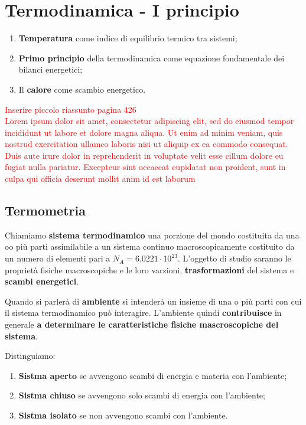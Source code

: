 \documentclass[x11names]{report}
\begin{document}
	
	
	
	\newpage
	
	\chapter{Termodinamica - I principio}
	\begin{es}{}
		\begin{enumerate}
			\item \textbf{Temperatura} come indice di equilibrio termico tra sistemi;
			\item \textbf{Primo principio} della termodinamica come equazione fondamentale dei bilanci energetici;
			\item Il \textbf{calore} come scambio energetico.
		\end{enumerate}
	\end{es}
	
	
	\textcolor{red}{Inserire piccolo riassunto pagina 426}\\
	
	\textcolor{red}{Lorem ipsum dolor sit amet, consectetur adipiscing elit, sed do eiusmod tempor incididunt ut labore et dolore magna aliqua. Ut enim ad minim veniam, quis nostrud exercitation ullamco laboris nisi ut aliquip ex ea commodo consequat. Duis aute irure dolor in reprehenderit in voluptate velit esse cillum dolore eu fugiat nulla pariatur. Excepteur sint occaecat cupidatat non proident, sunt in culpa qui officia deserunt mollit anim id est laborum}
	
	
	\section{Termometria}
	Chiamiamo \textbf{sistema termodinamico} una porzione del mondo costituita da una oo più parti assimilabile a un sistema continuo macroscopicamente costituito da un numero di elementi pari a \(N_A = 6.0221 \cdot 10^{23}\). L'oggetto di studio saranno le proprietà fisiche macroscopiche e le loro varzioni, \textbf{trasformazioni} del sistema e \textbf{scambi energetici}.
	
	Quando si parlerà di \textbf{ambiente} si intenderà un insieme di una o più parti con cui il sistema termodinamico può interagire. L'ambiente quindi \textbf{contribuisce} in generale \textbf{a determinare le caratteristiche fisiche mascroscopiche del sistema}.
	
	Distinguiamo:
	\begin{enumerate}
		\item \textbf{Sistma aperto} se avvengono scambi di energia e materia con l'ambiente;
		\item \textbf{Sistma chiuso} se avvengono solo scambi di energia con l'ambiente;
		\item \textbf{Sistma isolato} se non avvengono scambi con l'ambiente.
	\end{enumerate}
	
\end{document}

